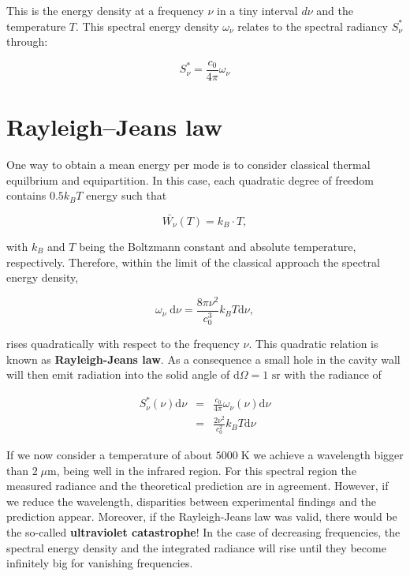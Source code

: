 \documentclass[
  a4paper,
]{book}
\begin{document}
This is the energy density at a frequency \(\nu\) in a tiny interval
\(d\nu\) and the temperature \(T\). This spectral energy density
\(\omega_{\nu}\) relates to the spectral radiancy \(S^*_{\nu}\) through:

\[
S^*_{\nu} = \frac{c_0}{4\pi} \omega_{\nu}
\]

\section{Rayleigh--Jeans law}\label{rayleighjeans-law}

One way to obtain a mean energy per mode is to consider classical
thermal equilbrium and equipartition. In this case, each quadratic
degree of freedom contains \(0.5 k_B T\) energy such that

\[
\bar{W_{\nu}} \left( T \right) = k_B \cdot T \mathrm{,}
\]

with \(k_B\) and \(T\) being the Boltzmann constant and absolute
temperature, respectively. Therefore, within the limit of the classical
approach the spectral energy density,

\[
\omega_{\nu} \; \mathrm{d} \nu = \frac{8 \pi \nu^2}{c_0^3} k_B T  \mathrm{d}\nu \mathrm{,}
\]

rises quadratically with respect to the frequency \(\nu\). This
quadratic relation is known as \textbf{Rayleigh-Jeans law}. As a
consequence a small hole in the cavity wall will then emit radiation
into the solid angle of \(\mathrm{d} \Omega = 1 \mbox{ sr}\) with the
radiance of

\[
\begin{aligned}
S^{\ast}_{\nu} \left( \nu \right) \mathrm{d} \nu & = & \frac{c_0}{4 \pi} \omega_{\nu} \left( \nu \right)  \mathrm{d} \nu\\
{} & = & \frac{2 \nu^2}{c_0^2} k_B T \mathrm{d} \nu
\end{aligned}
\]

If we now consider a temperature of about \(5000 \; \mathrm{K}\) we
achieve a wavelength bigger than \(2 \; \mu\mathrm{m}\), being well in
the infrared region. For this spectral region the measured radiance and
the theoretical prediction are in agreement. However, if we reduce the
wavelength, disparities between experimental findings and the prediction
appear. Moreover, if the Rayleigh-Jeans law was valid, there would be
the so-called \textbf{ultraviolet catastrophe}! In the case of
decreasing frequencies, the spectral energy density and the integrated
radiance will rise until they become infinitely big for vanishing
frequencies.
\end{document}
